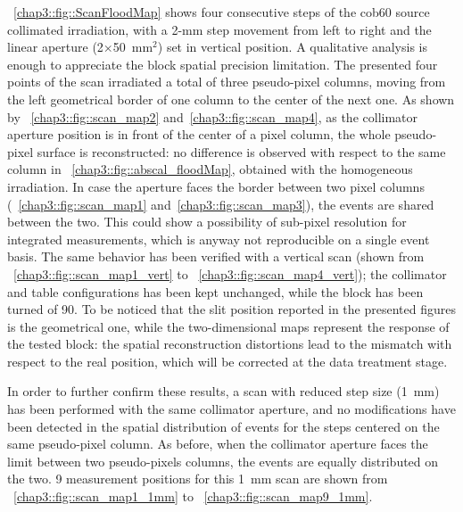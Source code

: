 \figurename~\ref{chap3::fig::ScanFloodMap} shows four consecutive steps of the \gls{cob60} source collimated irradiation, with a 2-mm step movement from left to right and the linear aperture (2$\times$50~mm$^2$) set in vertical position. A qualitative analysis is enough to appreciate the block spatial precision limitation. The presented four points of the scan irradiated a total of three pseudo-pixel columns, moving from the left geometrical border of one column to the center of the next one. As shown by \figurename~\ref{chap3::fig::scan_map2} and~\ref{chap3::fig::scan_map4}, as the collimator aperture position is in front of the center of a pixel column, the whole pseudo-pixel surface is reconstructed: no difference is observed with respect to the same column in \figurename~\ref{chap3::fig::abscal_floodMap}, obtained with the homogeneous irradiation. In case the aperture faces the border between two pixel columns (\figurename~\ref{chap3::fig::scan_map1} and~\ref{chap3::fig::scan_map3}), the events are shared between the two. This could show a possibility of sub-pixel resolution for integrated measurements, which is anyway not reproducible on a single event basis. The same behavior has been verified with a vertical scan (shown from \figurename~\ref{chap3::fig::scan_map1_vert} to \figurename~\ref{chap3::fig::scan_map4_vert}); the collimator and table configurations has been kept unchanged, while the block has been turned of 90\textdegree. To be noticed that the slit position reported in the presented figures is the geometrical one, while the two-dimensional maps represent the response of the tested block: the spatial reconstruction distortions lead to the mismatch with respect to the real position, which will be corrected at the data treatment stage.   
 
In order to further confirm these results, a scan with reduced step size (1~mm) has been performed with the same collimator aperture, and no modifications have been detected in the spatial distribution of events for the steps centered on the same pseudo-pixel column. As before, when the collimator aperture faces the limit between two pseudo-pixels columns, the events are equally distributed on the two. 9 measurement positions for this 1~mm scan are shown from \figurename~\ref{chap3::fig::scan_map1_1mm} to \figurename~\ref{chap3::fig::scan_map9_1mm}.
 

